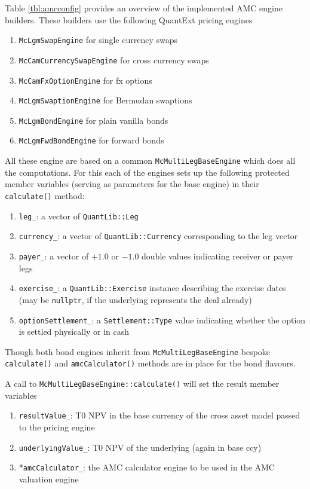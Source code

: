 \documentclass[12pt, a4paper]{article}
\begin{document}
Table \ref{tbl:amcconfig} provides an overview of the implemented AMC engine builders. These builders use the following
QuantExt pricing engines

\begin{enumerate}
\item \verb+McLgmSwapEngine+ for single currency swaps
\item \verb+McCamCurrencySwapEngine+ for cross currency swaps
\item \verb+McCamFxOptionEngine+ for fx options
\item \verb+McLgmSwaptionEngine+ for Bermudan swaptions
\item \verb+McLgmBondEngine+ for plain vanilla bonds
\item \verb+McLgmFwdBondEngine+ for forward bonds
\end{enumerate}

All these engine are based on a common \verb+McMultiLegBaseEngine+ which does all the computations. For this each of the
engines sets up the following protected member variables (serving as parameters for the base engine) in their
\verb+calculate()+ method:

\begin{enumerate}
\item \verb+leg_+: a vector of \verb+QuantLib::Leg+
\item \verb+currency_+: a vector of \verb+QuantLib::Currency+ corresponding to the leg vector
\item \verb+payer_+: a vector of $+1.0$ or $-1.0$ double values indicating receiver or payer legs
\item \verb+exercise_+: a \verb+QuantLib::Exercise+ instance describing the exercise dates (may be \verb+nullptr+, if
  the underlying represents the deal already)
\item \verb+optionSettlement_+: a \verb+Settlement::Type+ value indicating whether the option is settled physically or
  in cash
\end{enumerate}

Though both bond engines inherit from \verb+McMultiLegBaseEngine+ bespoke \verb+calculate()+ and \verb+amcCalculator()+
methods are in place for the bond flavours.

A call to \verb+McMultiLegBaseEngine::calculate()+ will set the result member variables

\begin{enumerate}
\item \verb+resultValue_+: T0 NPV in the base currency of the cross asset model passed to the pricing engine
\item \verb+underlyingValue_+: T0 NPV of the underlying (again in base ccy)
\item *\verb+amcCalculator_+: the AMC calculator engine to be used in the AMC valuation engine
\end{enumerate}
\end{document}
